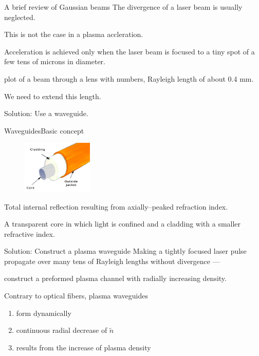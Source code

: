 \documentclass[final]{beamer}
\begin{document}
  \begin{frame}{A brief review of Gaussian beams}
    The divergence of a laser beam is usually neglected.

    This is not the case in a plasma accleration.
    
    Acceleration is achieved only when the laser beam is focused to a tiny spot of a few tens of microns in diameter.

    \begin{center}
      plot of a beam through a lens with numbers, Rayleigh length of about 0.4 mm.
    \end{center}
    We need to extend this length.

    Solution: Use a waveguide.
  \end{frame}
  \begin{frame}{Waveguides}{Basic concept}
   \begin{figure}
     \includegraphics[width=0.3\textwidth]{figures/optical_fiber.png}
   \end{figure}
   Total internal reflection resulting from axially--peaked refraction index.

   A transparent core in which light is confined and a cladding with a smaller refractive index.
  \end{frame}
  \begin{frame}{Solution: Construct a plasma waveguide}
    Making a tightly focused laser pulse propagate over many tens of Rayleigh lengths without divergence ---

    construct a preformed plasma channel with radially increasing density.

    Contrary to optical fibers, plasma waveguides
    \begin{enumerate}
      \item form dynamically
      \item continuous radial decrease of $\tilde n$
      \item results from the increase of plasma density
    \end{enumerate}
  \end{frame}
\end{document}
